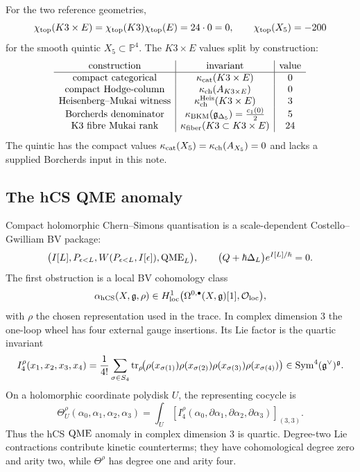 For the two reference geometries,
\[
  \chi_{\mathrm{top}}(K3\times E)=\chi_{\mathrm{top}}(K3)\chi_{\mathrm{top}}(E)=24\cdot 0=0,\qquad
  \chi_{\mathrm{top}}(X_5)=-200
\]
for the smooth quintic \(X_5\subset \mathbb P^4\).  The \(K3\times E\)
values split by construction:
\[
\begin{array}{c|c|c}
\text{construction} & \text{invariant} & \text{value}\\ \hline
\text{compact categorical} & \kappa_{\mathrm{cat}}(K3\times E) & 0\\
\text{compact Hodge-column} & \kappa_{\mathrm{ch}}(A_{K3\times E}) & 0\\
\text{Heisenberg--Mukai witness} &
  \kappa_{\mathrm{ch}}^{\mathrm{Heis}}(K3\times E) & 3\\
\text{Borcherds denominator} &
  \kappa_{\mathrm{BKM}}(\mathfrak g_{\Delta_5})=\frac{c_1(0)}{2} & 5\\
\text{K3 fibre Mukai rank} & \kappa_{\mathrm{fiber}}(K3\subset K3\times E) & 24
\end{array}
\]
The quintic has the compact values \(\kappa_{\mathrm{cat}}(X_5)=\kappa_{\mathrm{ch}}(A_{X_5})=0\)
and lacks a supplied Borcherds input in this note.

\subsection{The hCS QME anomaly}

Compact holomorphic Chern--Simons quantisation is a scale-dependent
Costello--Gwilliam BV package:
\[
  \bigl(I[L],P_{\epsilon<L},W(P_{\epsilon<L},I[\epsilon]),\mathrm{QME}_L\bigr),
  \qquad
  \bigl(Q+\hbar\Delta_L\bigr)e^{I[L]/\hbar}=0.
\]
The first obstruction is a local BV cohomology class
\[
  \alpha_{\mathrm{hCS}}(X,\mathfrak{g},\rho)
  \in
  H^1_{\mathrm{loc}}
  \bigl(\Omega^{0,\bullet}(X,\mathfrak{g})[1],\mathcal{O}_{\mathrm{loc}}\bigr),
\]
with \(\rho\) the chosen representation used in the trace.  In complex
dimension \(3\) the one-loop wheel has four external gauge insertions.
Its Lie factor is the quartic invariant
\[
  I_4^\rho(x_1,x_2,x_3,x_4)
  =
  \frac{1}{4!}\sum_{\sigma\in S_4}
  \mathrm{tr}_\rho\!\bigl(
    \rho(x_{\sigma(1)})\rho(x_{\sigma(2)})
    \rho(x_{\sigma(3)})\rho(x_{\sigma(4)})
  \bigr)
  \in \mathrm{Sym}^4(\mathfrak{g}^\vee)^{\mathfrak{g}}.
\]
On a holomorphic coordinate polydisk \(U\), the representing cocycle is
\[
  \Theta^\rho_U(\alpha_0,\alpha_1,\alpha_2,\alpha_3)
  =
  \int_U
  \left[
    I_4^\rho(
      \alpha_0,\partial\alpha_1,\partial\alpha_2,\partial\alpha_3
    )
  \right]_{(3,3)} .
\]
Thus the hCS \(\mathrm{QME}\) anomaly in complex dimension \(3\) is quartic.
Degree-two Lie contractions contribute kinetic counterterms; they have
cohomological degree zero and arity two, while \(\Theta^\rho\) has
degree one and arity four.

